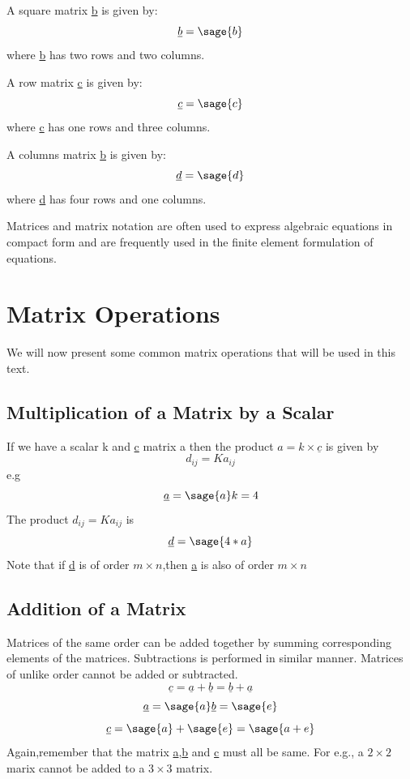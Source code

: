\documentclass[12pt]{report}
\begin{document}
A square matrix \underline{b} is given by:
\begin{equation}
\underline{b}=\sage{b}
\label{eq:square}
\end{equation}
where \underline{b} has two rows and two columns.

A row matrix \underline{c} is given by:
\begin{equation}
\underline{c}=\sage{c}
\label{eq:row}
\end{equation}
where \underline{c} has one rows and three columns.

A columns matrix \underline{b} is given by:
\begin{equation}\underline{d}=\sage{d}
\label{eq:col}
\end{equation}
where \underline{d} has four rows and one columns.

Matrices and matrix notation are often used to express algebraic equations in compact form and are frequently used in the finite element formulation of equations.
\section{Matrix Operations}
We will now present some common matrix operations that will be used in this text.
\subsection{Multiplication of a Matrix by a Scalar}
If we have a scalar k and \underline{c} matrix a then the product $a = k \times \underline{c} $ is given by
\begin{equation}d_{{ij}} = Ka_{{ij}} \label{eq:element}
\end{equation}
e.g
$$\underline{a}=\sage{a}
k= 4 $$
The product $d_{{ij}} = Ka_{{ij}}$ is 
$$\underline{d} = \sage{4*a}$$
Note that if \underline{d} is of order $ m \times n $,then \underline{a} is also of order $ m \times n $
\subsection{Addition of a Matrix}
Matrices of the same order can be added together by summing corresponding elements of the matrices. Subtractions is performed in similar manner. Matrices of unlike order cannot be added or subtracted.
\begin{equation}\underline{c}=\underline{a}+\underline{b}= \underline{b}+\underline{a} \end{equation}
$$\underline{a}=\sage{a}
\underline{b}=\sage{e}$$
$$\underline{c}=\sage{a} + \sage{e}=\sage{a+e}$$
Again,remember that the matrix \underline{a},\underline{b} and \underline{c} must all be same. For e.g., a $ 2 \times 2 $ marix cannot be added to a $ 3 \times 3 $ matrix.
\end{document}
